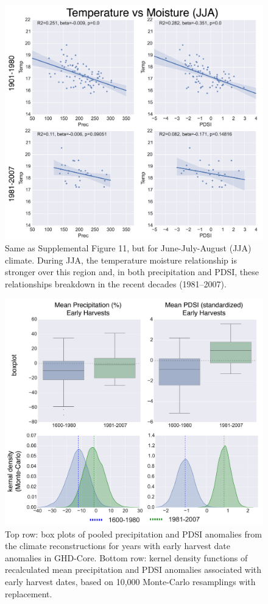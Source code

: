 \documentclass[12pt]{article}
\begin{document}
\begin{figure}
\center
\includegraphics[width=1.0\columnwidth,scale=2]{SUPP_fig_13_temp_vs_moist_JJA.png}
\caption{Same as Supplemental Figure 11, but for June-July-August (JJA) climate. During JJA, the temperature moisture relationship is stronger over this region and, in both precipitation and PDSI, these relationships breakdown in the recent decades (1981--2007).}
\end{figure}

\begin{figure}
\center
\includegraphics[width=1.0\columnwidth,scale=2]{SUPP_fig_14_JJA_boxplot_monte.png}
\caption{Top row: box plots of pooled precipitation and PDSI anomalies from the climate reconstructions for years with early harvest date anomalies in GHD-Core. Bottom row: kernel density functions of recalculated mean precipitation and PDSI anomalies associated with early harvest dates, based on 10,000 Monte-Carlo resamplings with replacement.}
\end{figure}
\end{document}
